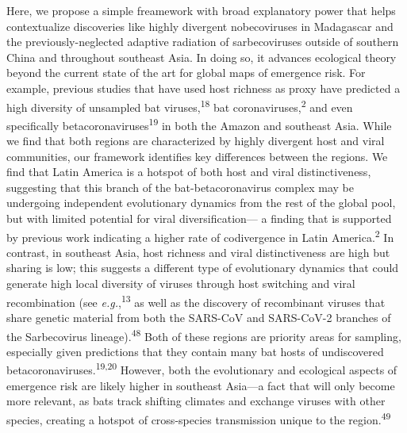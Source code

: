\documentclass[11pt]{article}
\begin{document}
Here, we propose a simple freamework with broad explanatory power that
helps contextualize discoveries like highly divergent nobecoviruses in
Madagascar and the previously-neglected adaptive radiation of
sarbecoviruses outside of southern China and throughout southeast Asia.
In doing so, it advances ecological theory beyond the current state of
the art for global maps of emergence risk. For example, previous studies
that have used host richness as proxy have predicted a high diversity of
unsampled bat viruses,\textsuperscript{18} bat
coronaviruses,\textsuperscript{2} and even specifically
betacoronaviruses\textsuperscript{19} in both the Amazon and southeast
Asia. While we find that both regions are characterized by highly
divergent host and viral communities, our framework identifies key
differences between the regions. We find that Latin America is a hotspot
of both host and viral distinctiveness, suggesting that this branch of
the bat-betacoronavirus complex may be undergoing independent
evolutionary dynamics from the rest of the global pool, but with limited
potential for viral diversification--- a finding that is supported by
previous work indicating a higher rate of codivergence in Latin
America.\textsuperscript{2} In contrast, in southeast Asia, host
richness and viral distinctiveness are high but sharing is low; this
suggests a different type of evolutionary dynamics that could generate
high local diversity of viruses through host switching and viral
recombination (see \emph{e.g.},\textsuperscript{13} as well as the
discovery of recombinant viruses that share genetic material from both
the SARS-CoV and SARS-CoV-2 branches of the Sarbecovirus
lineage).\textsuperscript{48} Both of these regions are priority areas
for sampling, especially given predictions that they contain many bat
hosts of undiscovered betacoronaviruses.\textsuperscript{19,20} However,
both the evolutionary and ecological aspects of emergence risk are
likely higher in southeast Asia---a fact that will only become more
relevant, as bats track shifting climates and exchange viruses with
other species, creating a hotspot of cross-species transmission unique
to the region.\textsuperscript{49}
\end{document}
